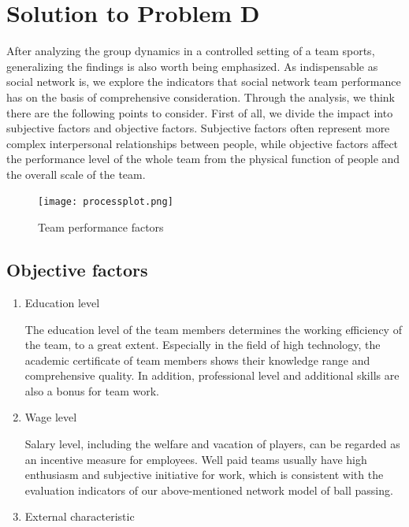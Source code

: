 \documentclass{mcmthesis}
\begin{document}
{\section{Solution to Problem D}
After analyzing the group dynamics in a controlled setting of a team sports, generalizing the findings is also worth being emphasized. As indispensable as social network is, we explore the indicators that social network team performance has on the basis of comprehensive consideration. Through the analysis, we think there are the following points to consider. First of all, we divide the impact into subjective factors and objective factors. Subjective factors often represent more complex interpersonal relationships between people, while objective factors affect the performance level of the whole team from the physical function of people and the overall scale of the team.

\begin{figure}[h]
\small
\centering
\texttt{[image: processplot.png]}
\caption{Team performance factors} \label{fig:aa}
\end{figure}

\subsection{Objective factors}
\begin{enumerate}
\item Education level

The education level of the team members determines the working efficiency of the team, to a great extent. Especially in the field of high technology, the academic certificate of team members shows their knowledge range and comprehensive quality. In addition, professional level and additional skills are also a bonus for team work.

\item Wage level

Salary level, including the welfare and vacation of players, can be regarded as an incentive measure for employees. Well paid teams usually have high enthusiasm and subjective initiative for work, which is consistent with the evaluation indicators of our above-mentioned network model of ball passing.

\item External characteristic


\end{enumerate}}
\end{document}
